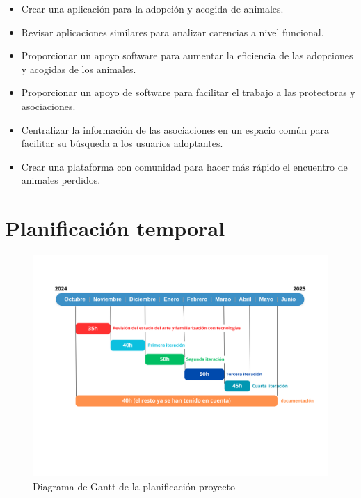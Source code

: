 \begin{itemize}
	\item Crear una aplicación para la adopción y acogida de animales. %
	\item Revisar aplicaciones similares para analizar carencias a nivel funcional. %
	\item Proporcionar un apoyo software para aumentar la eficiencia de las adopciones y acogidas de los animales. %
	\item Proporcionar un apoyo de software para facilitar el trabajo a las protectoras y asociaciones.
	\item Centralizar la información de las asociaciones en un espacio común para facilitar su búsqueda a los usuarios adoptantes.
	\item Crear una plataforma con comunidad para hacer más rápido el encuentro de animales perdidos.
\end{itemize}

\section{Planificación temporal}

\begin{figure}[H]
	\centering
	\includegraphics[width=1\linewidth]{"Sprint 0/gantt"}
	\caption{Diagrama de Gantt de la planificación proyecto}
	\label{fig:gantt}
\end{figure}

